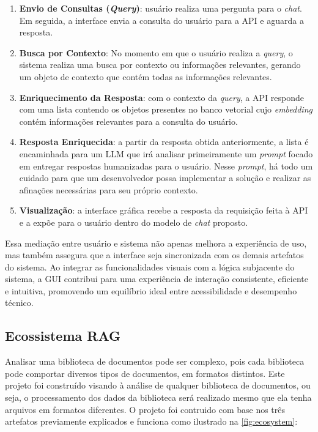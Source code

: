 \documentclass[a4paper, 12pt]{article}
\begin{document}
    \begin{enumerate}
        \item \textbf{Envio de Consultas (\textit{Query})}: usuário realiza uma pergunta para o \textit{chat}. Em seguida, a interface envia a consulta do usuário para a API e aguarda a resposta.
        \item \textbf{Busca por Contexto}: No momento em que o usuário realiza a \textit{query}, o sistema realiza uma busca por contexto ou informações relevantes, gerando um objeto de contexto que contém todas as informações relevantes.
        \item \textbf{Enriquecimento da Resposta}: com o contexto da \textit{query}, a API responde com uma lista contendo os objetos presentes no banco vetorial cujo \textit{embedding} contém informações relevantes para a consulta do usuário.
        \item \textbf{Resposta Enriquecida}: a partir da resposta obtida anteriormente, a lista é encaminhada para um LLM que irá analisar primeiramente um \textit{prompt} focado em entregar respostas humanizadas para o usuário. Nesse \textit{prompt}, há todo um cuidado para que um desenvolvedor possa implementar a solução e realizar as afinações necessárias para seu próprio contexto.
        \item \textbf{Visualização}: a interface gráfica recebe a resposta da requisição feita à API e a expõe para o usuário dentro do modelo de \textit{chat} proposto.
    \end{enumerate}

    Essa mediação entre usuário e sistema não apenas melhora a experiência de uso, mas também assegura que a interface seja sincronizada com os demais artefatos do sistema. Ao integrar as funcionalidades visuais com a lógica subjacente do sistema, a GUI contribui para uma experiência de interação consistente, eficiente e intuitiva, promovendo um equilíbrio ideal entre acessibilidade e desempenho técnico.
    
    \subsection{Ecossistema RAG} \label{sec:ecosystem}
    
    Analisar uma biblioteca de documentos pode ser complexo, pois cada biblioteca pode comportar diversos tipos de documentos, em formatos distintos. Este projeto foi construído visando à análise de qualquer biblioteca de documentos, ou seja, o processamento dos dados da biblioteca será realizado mesmo que ela tenha arquivos em formatos diferentes. O projeto foi contruido com base nos três artefatos previamente explicados e funciona como ilustrado na \autoref{fig:ecosystem}:
\end{document}
